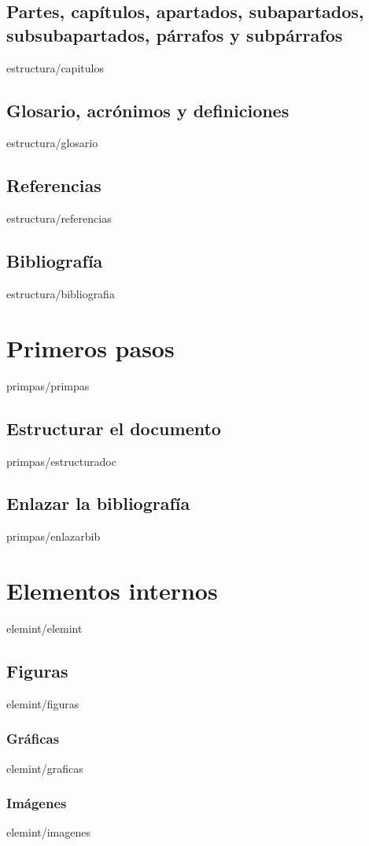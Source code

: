 \documentclass[epsbased,copyright,final,printable,covers,extendedindex,firstnumbered,tfg,gnuplot]{tfgtfmthesisuam}
\begin{document}
  \section[Partes, capítulos ...]{Partes, capítulos, apartados, subapartados, subsubapartados, párrafos y subpárrafos\label{SEC:CAPITULOS}}{estructura/capitulos}
  \section[Glosario, acrónimos y definiciones]{Glosario, acrónimos y definiciones\label{SEC:GLOSARIO}}{estructura/glosario}
  \section{Referencias\label{SEC:REFERENCIAS}}{estructura/referencias}
  \section{Bibliografía\label{SEC:BIBLIOGRAFIA}}{estructura/bibliografia}

\chapter{Primeros pasos\label{CAP:PRIMEROSPASOS}}{primpas/primpas}
  \section{Estructurar el documento\label{SEC:ESTRUCTURAR}}{primpas/estructuradoc}
  \section{Enlazar la bibliografía\label{SEC:ENLAZBIBLIOGRAFIA}}{primpas/enlazarbib}

\chapter{Elementos internos\label{CAP:ELEMINT}}{elemint/elemint}
  \section{Figuras\label{SEC:FIGURAS}}{elemint/figuras}
    \subsection{Gráficas\label{SS:GRAFICAS}}{elemint/graficas}
    \subsection{Imágenes\label{SS:INMAGENES}}{elemint/imagenes}
\end{document}
